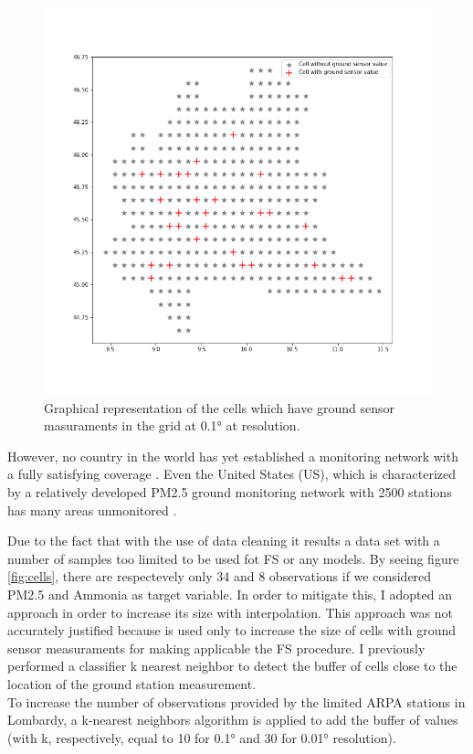 \begin{figure}[H] 
\centering
\includegraphics[scale=0.4]{images/cell_with_sensors.png}
  \caption{Graphical representation of the cells which have ground sensor masuraments in the grid at 0.1° at resolution.}
 \label{fig:knn-interpolated}
\end{figure}
However, no country in the world has yet established a monitoring network with a fully satisfying coverage \cite{liu2018improve}. Even the United States (US), which is characterized by a relatively developed PM2.5 ground monitoring network with 2500 stations has many areas unmonitored \cite{liu2018improve}. \par
Due to the fact that with the use of data cleaning it results a data set with a number of samples too limited to be used fot FS or any models.
By seeing figure \ref{fig:cells}, there are respectevely only 34 and 8 observations if we considered PM2.5 and Ammonia as target variable.
In order to mitigate this, I adopted an approach in order to increase its size with interpolation.
This approach was not accurately justified because is used only to increase the size of cells with ground sensor measuraments for making applicable the FS procedure.
I previously performed a classifier k nearest neighbor  \cite{taunk2019brief} to detect the buffer of cells close to the location of the ground station measurement.\\
To increase the number of observations provided by the limited ARPA stations in Lombardy, a k-nearest neighbors algorithm is applied to add the buffer of values (with k, respectively, equal to 10 for 0.1° and 30 for 0.01° resolution). \\ 


